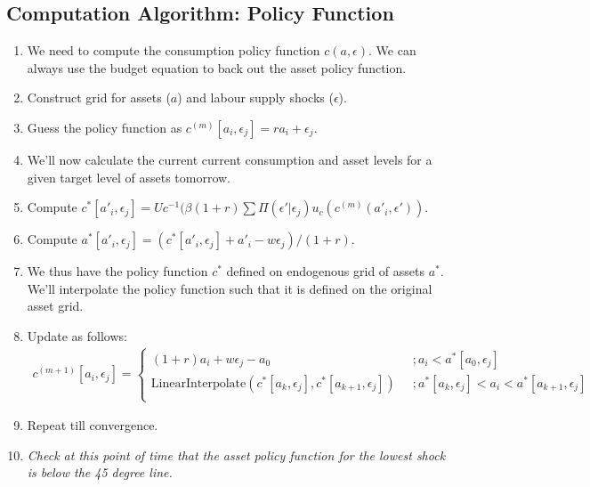\documentclass[12pt]{article}
\begin{document}
\subsection{Computation Algorithm: Policy Function}
\begin{enumerate}
\item We need to compute the consumption policy function $c(a, \epsilon)$. We can always use the budget equation to back out the asset policy function.  
\item Construct grid for assets ($a$) and  labour supply shocks ($\epsilon$).
\item Guess the policy function as $c^{(m)}[a_i, \epsilon_j] = ra_i + \epsilon_j$.
\item We'll now calculate the current current consumption and asset levels for a given target level of assets tomorrow.
\item Compute $c^*[a'_i, \epsilon_j] = Uc^{-1}(\beta(1+r)\sum \Pi(\epsilon'|\epsilon_j)u_c(c^{(m)}(a'_i, \epsilon'))$.
\item Compute $a^*[a'_i, \epsilon_j] = (c^*[a'_i, \epsilon_j] + a'_i -w\epsilon_j)/(1+r).$
\item We thus have the policy function $c^*$ defined on endogenous grid of assets $a^*$. We'll interpolate the policy function such that it is defined on the original asset grid.
\item Update as follows:
\begin{align*}
c^{(m+1)}[a_i, \epsilon_j]= 
\begin{cases}
(1+r)a_i + w\epsilon_j - a_0 & \; \; ;  a_i < a^*[a_0, \epsilon_j] \\
\text{LinearInterpolate} (c^*[a_k, \epsilon_j], c^*[a_{k+1}, \epsilon_j])  & \; \; ; a^*[a_k, \epsilon_j] < a_i < a^*[a_{k+1}, \epsilon_j] \\
\end{cases}
\end{align*}
\item Repeat till convergence.
\item \textit{Check at this point of time that the asset policy function for the lowest shock is below the 45 degree line.}
\end{enumerate}
\end{document}
